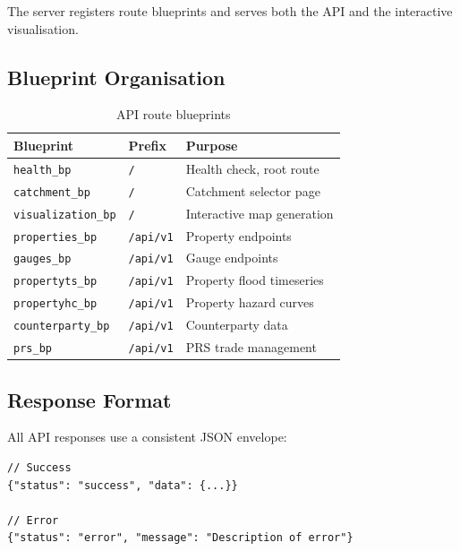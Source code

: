 \documentclass[11pt,a4paper]{article}
\begin{document}
The server registers route blueprints and serves both the API and the
interactive visualisation.

\subsection{Blueprint Organisation}

\begin{table}[H]
    \centering
    \caption{API route blueprints}
    \label{tab:blueprints}
    \begin{tabular}{@{}lll@{}}
        \toprule
        \textbf{Blueprint} & \textbf{Prefix} & \textbf{Purpose} \\
        \midrule
        \texttt{health\_bp}       & \texttt{/}          & Health check, root route \\
        \texttt{catchment\_bp}    & \texttt{/}          & Catchment selector page \\
        \texttt{visualization\_bp}& \texttt{/}          & Interactive map generation \\
        \texttt{properties\_bp}   & \texttt{/api/v1}    & Property endpoints \\
        \texttt{gauges\_bp}       & \texttt{/api/v1}    & Gauge endpoints \\
        \texttt{propertyts\_bp}   & \texttt{/api/v1}    & Property flood timeseries \\
        \texttt{propertyhc\_bp}   & \texttt{/api/v1}    & Property hazard curves \\
        \texttt{counterparty\_bp} & \texttt{/api/v1}    & Counterparty data \\
        \texttt{prs\_bp}          & \texttt{/api/v1}    & PRS trade management \\
        \bottomrule
    \end{tabular}
\end{table}

\subsection{Response Format}

All API responses use a consistent JSON envelope:

\begin{lstlisting}[language={},caption={Standard API response format}]
// Success
{"status": "success", "data": {...}}

// Error
{"status": "error", "message": "Description of error"}
\end{lstlisting}
\end{document}
